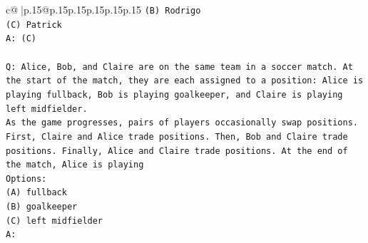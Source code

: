\documentclass{article}
\begin{document}
{\begin{supertabular}{c@{$\;$}|p{.15\linewidth}@{}p{.15\linewidth}p{.15\linewidth}p{.15\linewidth}p{.15\linewidth}p{.15\linewidth}}
{{{\texttt{(B) Rodrigo} \\
\texttt{(C) Patrick} \\
\texttt{A: (C)} \\
\\ 
\texttt{Q: Alice, Bob, and Claire are on the same team in a soccer match. At the start of the match, they are each assigned to a position: Alice is playing fullback, Bob is playing goalkeeper, and Claire is playing left midfielder.} \\
\texttt{As the game progresses, pairs of players occasionally swap positions. First, Claire and Alice trade positions. Then, Bob and Claire trade positions. Finally, Alice and Claire trade positions. At the end of the match, Alice is playing} \\
\texttt{Options:} \\
\texttt{(A) fullback} \\
\texttt{(B) goalkeeper} \\
\texttt{(C) left midfielder} \\
\texttt{A:} \\
            }
        }
    }
     \\ \\


\end{supertabular}}
\end{document}
